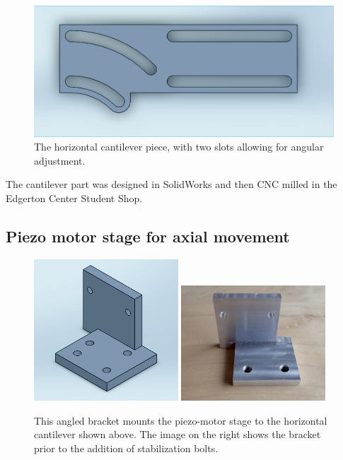\begin{figure}[h!]
\centering
\includegraphics[width=1.0\textwidth]{Images/Alignment/horizontal_part.png}
\caption{The horizontal cantilever piece, with two slots allowing for angular adjustment.}
\end{figure}

The cantilever part was designed in SolidWorks and then CNC milled in the Edgerton Center Student Shop.

\subsection{Piezo motor stage for axial movement}

\begin{figure}[h!]
\centering
\includegraphics[width=0.48\textwidth]{Images/Alignment/angle_bracket2.png}
\includegraphics[width=0.48\textwidth]{Images/Alignment/angle_bracket.jpg}
\caption{This angled bracket mounts the piezo-motor stage to the horizontal cantilever shown above. The image on the right shows the bracket prior to the addition of stabilization bolts.}
\end{figure}

